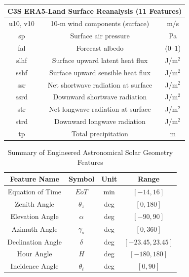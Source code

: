 \documentclass[conference]{IEEEtran}
\begin{document}
\begin{table}[!hb]
\begin{tabular}{|c|c|c|}
			\multicolumn{3}{|c|}{\textbf{C3S ERA5-Land Surface Reanalysis (11 Features)}} \\ \hline
			u10, v10  & 10-m wind components (surface)                       & m/s \\ \hline
			sp        & Surface air pressure                                 & Pa \\ \hline
			fal       & Forecast albedo                                      & (0--1) \\ \hline
			slhf      & Surface upward latent heat flux             & J/m$^{2}$ \\ \hline
			sshf      & Surface upward sensible heat flux           & J/m$^{2}$ \\ \hline
			ssr       & Net shortwave radiation at surface          & J/m$^{2}$ \\ \hline
			ssrd      & Downward shortwave radiation                & J/m$^{2}$ \\ \hline
			str       & Net longwave radiation at surface           & J/m$^{2}$ \\ \hline
			strd      & Downward longwave radiation                 & J/m$^{2}$ \\ \hline
			tp        & Total precipitation                         & m \\ \hline
		\end{tabular}
	\end{table}
	
	\begin{table}[!hb]
		\centering
		\caption{Summary of Engineered Astronomical Solar Geometry Features}
		\label{tab:solar_features}
		\setlength{\tabcolsep}{5pt}
		\footnotesize
		\begin{tabular}{|c|c|c|c|}
			\hline
			\textbf{Feature Name} & \textbf{Symbol} & \textbf{Unit} & \textbf{Range} \\ \hline
			Equation of Time      & $EoT$           & min           & $[-14, 16]$ \\ \hline
			Zenith Angle          & $\theta_z$      & deg           & $[0, 180]$ \\ \hline
			Elevation Angle       & $\alpha$        & deg           & $[-90, 90]$ \\ \hline
			Azimuth Angle         & $\gamma_s$      & deg           & $[0, 360]$ \\ \hline
			Declination Angle     & $\delta$        & deg           & $[-23.45, 23.45]$ \\ \hline
			Hour Angle            & $H$             & deg           & $[-180, 180]$ \\ \hline
			Incidence Angle       & $\theta_i$      & deg           & $[0, 90]$ \\ \hline
		\end{tabular}
	\end{table}
	
\end{document}
